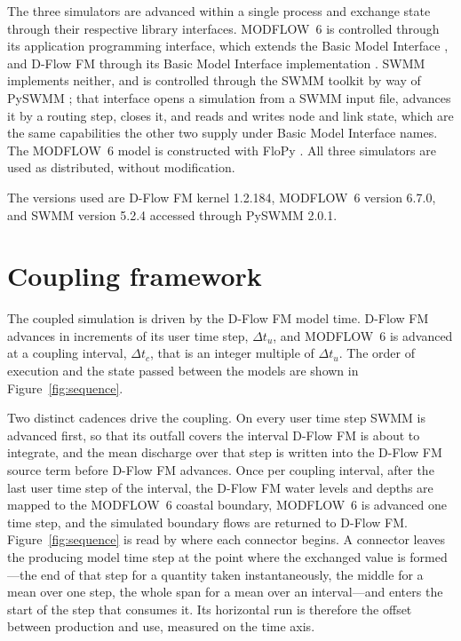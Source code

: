 \documentclass[preprint,authoryear,11pt]{elsarticle}
\begin{document}
The three simulators are advanced within a single process and exchange state through their respective library interfaces. MODFLOW~6 is controlled through its application programming interface, which extends the Basic Model Interface \citep{hughes2022modflowapi}, and D-Flow FM through its Basic Model Interface implementation \citep{hutton2020bmi}. SWMM implements neither, and is controlled through the SWMM toolkit by way of PySWMM \citep{mcdonnell2020pyswmm}; that interface opens a simulation from a SWMM input file, advances it by a routing step, closes it, and reads and writes node and link state, which are the same capabilities the other two supply under Basic Model Interface names. The MODFLOW~6 model is constructed with FloPy \citep{hughes2023flopy}. All three simulators are used as distributed, without modification.

The versions used are D-Flow FM kernel 1.2.184, MODFLOW~6 version 6.7.0, and SWMM version 5.2.4 accessed through PySWMM 2.0.1.

\section{Coupling framework}

The coupled simulation is driven by the D-Flow FM model time. D-Flow FM advances in increments of its user time step, $\Delta t_u$, and MODFLOW~6 is advanced at a coupling interval, $\Delta t_c$, that is an integer multiple of $\Delta t_u$. The order of execution and the state passed between the models are shown in Figure~\ref{fig:sequence}.

Two distinct cadences drive the coupling. On every user time step SWMM is advanced first, so that its outfall covers the interval D-Flow FM is about to integrate, and the mean discharge over that step is written into the D-Flow FM source term before D-Flow FM advances. Once per coupling interval, after the last user time step of the interval, the D-Flow FM water levels and depths are mapped to the MODFLOW~6 coastal boundary, MODFLOW~6 is advanced one time step, and the simulated boundary flows are returned to D-Flow FM. Figure~\ref{fig:sequence} is read by where each connector begins. A connector leaves the producing model time step at the point where the exchanged value is formed---the end of that step for a quantity taken instantaneously, the middle for a mean over one step, the whole span for a mean over an interval---and enters the start of the step that consumes it. Its horizontal run is therefore the offset between production and use, measured on the time axis.
\end{document}
